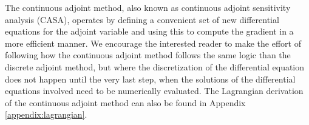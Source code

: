 The continuous adjoint method, also known as continuous adjoint sensitivity analysis (CASA), operates by defining a convenient set of new differential equations for the adjoint variable and using this to compute the gradient in a more efficient manner. 
We encourage the interested reader to make the effort of following how the continuous adjoint method follows the same logic than the discrete adjoint method, but where the discretization of the differential equation does not happen until the very last step, when the solutions of the differential equations involved need to be numerically evaluated. 
The Lagrangian derivation of the continuous adjoint method can also be found in Appendix \ref{appendix:lagrangian}.

